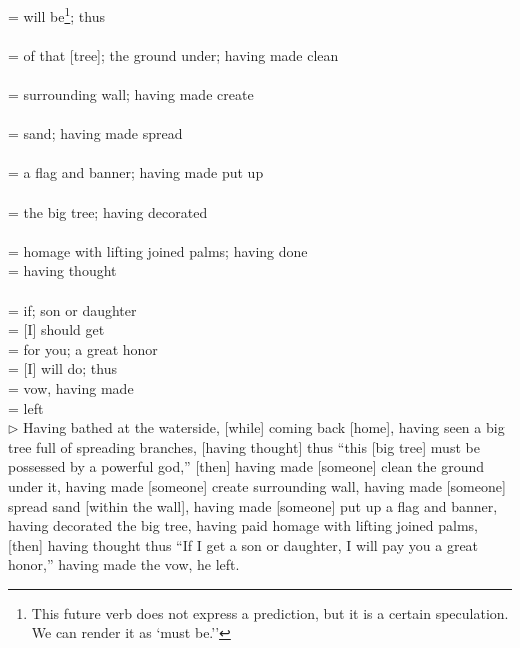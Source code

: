  = will be\footnote{This future verb does not express a prediction, but it is a certain speculation. We can render it as `must be.''}; thus\\[0.5mm]
\\[0.5mm]
= of that [tree]; the ground under; having made clean\\[0.5mm]
\\[0.5mm]
= surrounding wall; having made create\\[0.5mm]
\\[0.5mm]
= sand; having made spread\\[0.5mm]
\\[0.5mm]
= a flag and banner; having made put up\\[0.5mm]
\\[0.5mm]
= the big tree; having decorated\\[0.5mm]
\fbox{\fbox{\pali{a\~njali\d m} [C11.R]} \fbox{\pali{karitv\=a} [C11.V]} C11]}\\[0.5mm]
= homage with lifting joined palms; having done\\[0.5mm]
\fbox{\fbox{[\pali{cintetv\=a}] [C12.V]} [C12]} = having thought\\[0.5mm]
\\[0.5mm]
= if; son or daughter\\[0.5mm]
 = [I] should get\\[0.5mm]
 = for you; a great honor\\[0.5mm]
 = [I] will do; thus\\[0.5mm]
 = vow, having made\\[0.5mm]
 = left\\[1mm]
\normalsize
$\triangleright$ Having bathed at the waterside, [while] coming back [home], having seen a big tree full of spreading branches, [having thought] thus ``this [big tree] must be possessed by a powerful god,'' [then] having made [someone] clean the ground under it, having made [someone] create surrounding wall, having made [someone] spread sand [within the wall], having made [someone] put up a flag and banner, having decorated the big tree, having paid homage with lifting joined palms, [then] having thought thus ``If I get a son or daughter, I will pay you a great honor,'' having made the vow, he left.\\[1.5mm]

